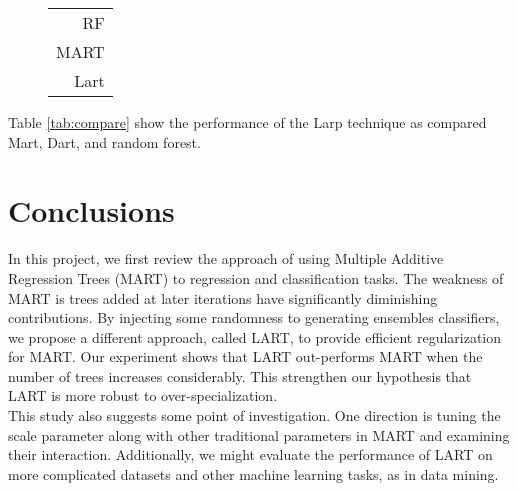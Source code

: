 \documentclass{article} %
\begin{document}
\begin{figure}	\centering
	\begin{tabular}{|r|}
 \hline
 
 \hline
               RF \\
               MART \\
               Lart \\\hline
	\end{tabular} 	
	\caption{ }
\end{figure}



Table \ref{tab:compare} show the performance of the Larp technique as compared Mart, Dart, and random forest.

\section{Conclusions}
In this project, we first review the approach of using Multiple Additive Regression Trees (MART) to regression and classification tasks. The weakness of MART is trees added at later iterations have significantly diminishing contributions. By injecting some randomness to generating ensembles classifiers, we propose a different approach, called LART, to provide efficient regularization for MART. Our experiment shows that LART out-performs MART when the number of trees increases considerably. This strengthen our hypothesis that LART is more robust to over-specialization.\\

This study also suggests some point of investigation. One direction is tuning the scale parameter along with other traditional parameters in MART and examining their interaction. Additionally, we might evaluate the performance of LART on more complicated datasets and other machine learning tasks, as in data mining.



\nocite{*}


\end{document}

